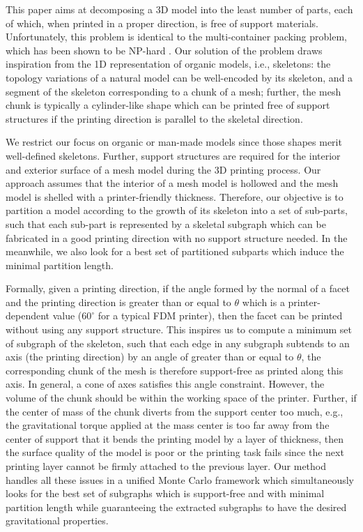 This paper aims at decomposing a 3{D} model into the least number of parts, each of which, when printed in a proper direction, is free of support materials. Unfortunately, this problem is identical to the multi-container packing problem, which has been shown to be NP-hard \cite{Fukunaga:2007}. Our solution of the problem draws inspiration from the 1{D} representation of organic models, i.e., skeletons: the topology variations of a natural model can be well-encoded by its skeleton, and a segment of the skeleton corresponding to a chunk of a mesh; further, the mesh chunk is typically a cylinder-like shape which can be printed free of support structures if the printing direction is parallel to the skeletal direction.

We restrict our focus on organic or man-made models since those shapes merit well-defined skeletons. Further, support structures are required for the interior and exterior surface of a mesh model during the 3{D} printing process. Our approach assumes that the interior of a mesh model is hollowed and the mesh model is shelled with a printer-friendly thickness. Therefore, our objective is to partition a model according to the growth of its skeleton into a set of sub-parts, such that each sub-part is represented by a skeletal subgraph which can be fabricated in a good printing direction with no support structure needed. In the meanwhile, we also look for a best set of partitioned subparts which induce the minimal partition length.

Formally, given a printing direction, if the angle formed by the normal of a facet and the printing direction is greater than or equal to $\theta$ which is a printer-dependent value ($60^{\circ}$ for a typical FDM printer), then the facet can be printed without using any support structure. This inspires us to compute a minimum set of subgraph of the skeleton, such that each edge in any subgraph subtends to an axis (the printing direction) by an angle of greater than or equal to $\theta$, the corresponding chunk of the mesh is therefore support-free as printed along this axis. In general, a cone of axes satisfies this angle constraint. However, the volume of the chunk should be within the working space of the printer. Further, if the center of mass of the chunk diverts from the support center too much, e.g., the gravitational torque applied at the mass center is too far away from the center of support that it bends the printing model by a layer of thickness, then the surface quality of the model is poor or the printing task fails since the next printing layer cannot be firmly attached to the previous layer. Our method handles all these issues in a unified Monte Carlo framework which simultaneously looks for the best set of subgraphs which is support-free and with minimal partition length while guaranteeing the extracted subgraphs to have the desired gravitational properties.

